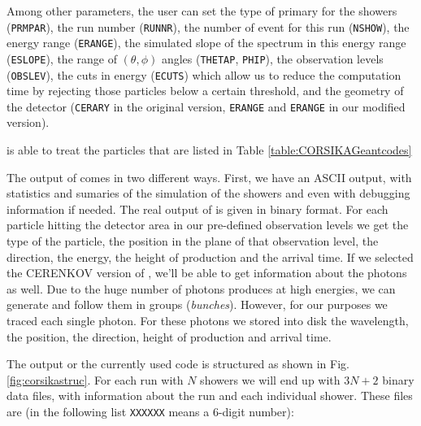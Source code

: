 \CORSIKAGeanttable

Among other parameters, the user can set the type of primary for the
showers (\texttt{PRMPAR}), the run number (\texttt{RUNNR}), the number
of event for this run (\texttt{NSHOW}), the energy range
(\texttt{ERANGE}), the simulated slope of the spectrum in this energy
range (\texttt{ESLOPE}), the range of $(\theta,\phi)$ angles
(\texttt{THETAP}, \texttt{PHIP}), the observation levels
(\texttt{OBSLEV}), the cuts in energy (\texttt{ECUTS}) which allow us
to reduce the computation time by rejecting those particles below a
certain threshold, and the geometry of the detector (\texttt{CERARY}
in the original version, \texttt{ERANGE} and \texttt{ERANGE} in our
modified version).

\CORSIKA is able to treat the particles that are listed in Table
\ref{table:CORSIKAGeantcodes}

The output of \CORSIKA comes in two different ways. First, we have an
ASCII output, with statistics and sumaries of the simulation of the
showers and even with debugging information if needed.  The real
output of \CORSIKA is given in binary format. For each particle hitting
the detector area in our pre-defined observation levels we get the
type of the particle, the position in the plane of that observation
level, the direction, the energy, the height of production and the
arrival time. If we selected the CERENKOV version of \CORSIKA, we'll be
able to get information about the \Cherenkov photons as well. Due to
the huge number of \Cherenkov photons produces at high energies, we
can generate and follow them in groups (\emph{bunches}).  However, for
our purposes we traced each single \Cherenkov photon. For these
photons we stored into disk the wavelength, the position, the
direction, height of production and arrival time.

The output or the currently used \CORSIKA code is structured as shown
in Fig. \ref{fig:corsikastruc}. For each run with $N$ showers we will
end up with $3 N+2$ binary data files, with information about the
run and each individual shower. These files are (in the following list
\texttt{XXXXXX} means a 6-digit number):

\CORSIKAstructfig

